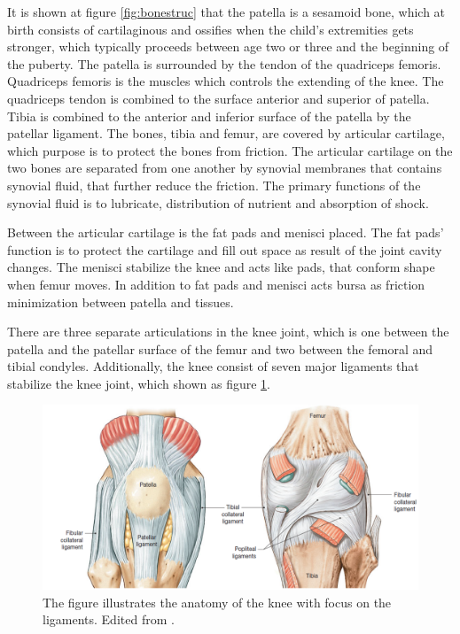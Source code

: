 \noindent
It is shown at figure \ref{fig:bonestruc} that the patella is a sesamoid bone, which at birth consists of cartilaginous and ossifies when the child’s extremities gets stronger, which typically proceeds between age two or three and the beginning of the puberty. 
The patella is surrounded by the tendon of the quadriceps femoris. Quadriceps femoris is the muscles which controls the extending of the knee. The quadriceps tendon is combined to the surface anterior and superior of patella. Tibia is combined to the anterior and inferior surface of the patella by the patellar ligament. The bones, tibia and femur, are covered by articular cartilage, which purpose is to protect the bones from friction. The articular cartilage on the two bones are separated from one another by synovial membranes that contains synovial fluid, that further reduce the friction. The primary functions of the synovial fluid is to lubricate, distribution of nutrient and absorption of shock.\citep{Martini2012}

Between the articular cartilage is the fat pads and menisci placed. The fat pads’ function is to protect the cartilage and fill out space as result of the joint cavity changes. The menisci stabilize the knee and acts like pads, that conform shape when femur moves. In addition to fat pads and menisci acts bursa as friction minimization between patella and tissues.\citep{Martini2012}
\noindent


There are three separate articulations in the knee joint, which is one between the patella and the patellar surface of the femur and two between the femoral and tibial condyles. Additionally, the knee consist of seven major ligaments that stabilize the knee joint, which shown as figure \ref{fig:knee}.\citep{Martini2012}

\begin{figure} [H]
\centering
\includegraphics[width=1\textwidth]{figures/knee}
\caption{The figure illustrates the anatomy of the knee with focus on the ligaments. Edited from \citep{Martini2012}.}
\label{fig:knee}
\end{figure}

